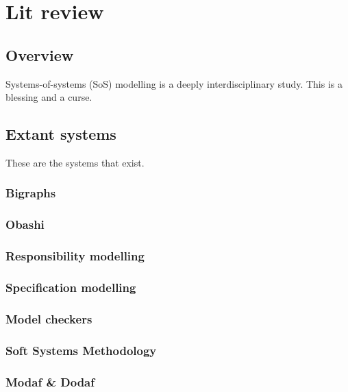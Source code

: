 \chapter{Lit review}

\section{Overview}

Systems-of-systems (SoS) modelling is a deeply interdisciplinary study. This is a blessing and a curse.
\par


\section{Extant systems}
These are the systems that exist.


\subsection{Bigraphs}


\subsection{Obashi}


\subsection{Responsibility modelling}


\subsection{Specification modelling}


\subsection{Model checkers}


\subsection{Soft Systems Methodology}


\subsection{Modaf \& Dodaf}


